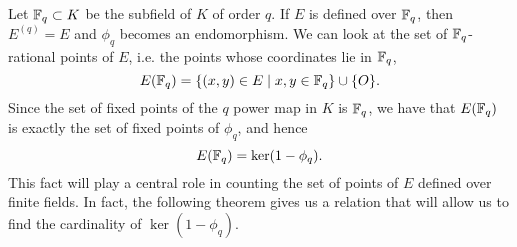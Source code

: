 Let $\mathbb{F}_q \subset K$ be the subfield of $K$ of order $q$.
If $E$ is defined over $\mathbb{F}_q$,
then $E^{(q)} = E$ and $\phi_q$ becomes an endomorphism. 
We can look at the set of $\mathbb{F}_q$-rational points of $E$,
i.e. the points whose coordinates lie in $\mathbb{F}_q$,
\begin{equation*}
	E(\mathbb{F}_q) = \{(x, y) \in E\mid x,y \in \mathbb{F}_q\} \cup \{O\}.
\end{equation*}
Since the set of fixed points of the $q$ power map in $K$ is
$\mathbb{F}_q$, we have that $E(\mathbb{F}_q)$ is exactly the set of fixed points of $\phi_q$,
and hence
\begin{equation*}
	E(\mathbb{F}_q) = \ker(1 - \phi_q).
\end{equation*}
This fact will play a central role in counting
the set of points of $E$ defined
over finite fields. In fact, the following theorem gives us
a relation that will
allow us to find the cardinality of $\ker(1 - \phi_q)$.


